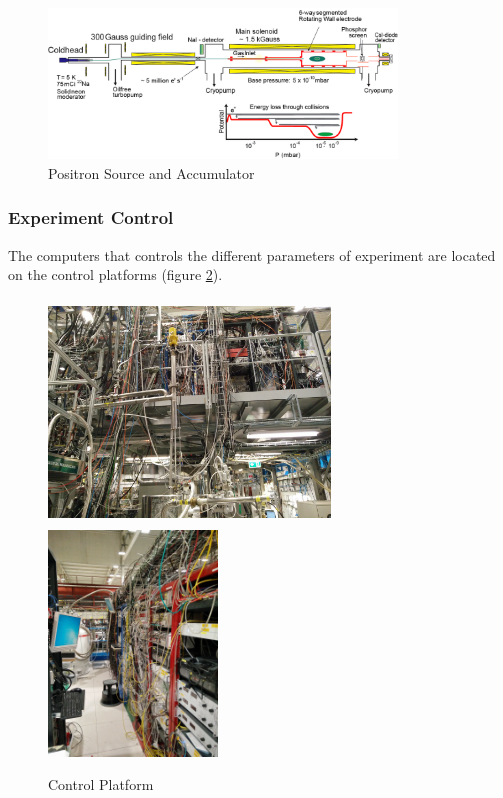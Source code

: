\documentclass[12pt,a4paper]{article}
\begin{document}
 
\begin{figure}[h]
\centering
\includegraphics[width=110 mm, height=40mm]{fullsetup}
\caption{Positron Source and Accumulator}
\label{positroon}
\end{figure}

\subsubsection{Experiment Control}

The computers that controls the different parameters of experiment are located on the control platforms (figure \ref{platform}). 


\begin{figure}[h]

\includegraphics[height=60mm, width=75mm]{control_platform-1}
\includegraphics[width=45mm]{control_plattform2}
\caption{Control Platform}
\label{platform}
\end{figure}		
	
\end{document}
